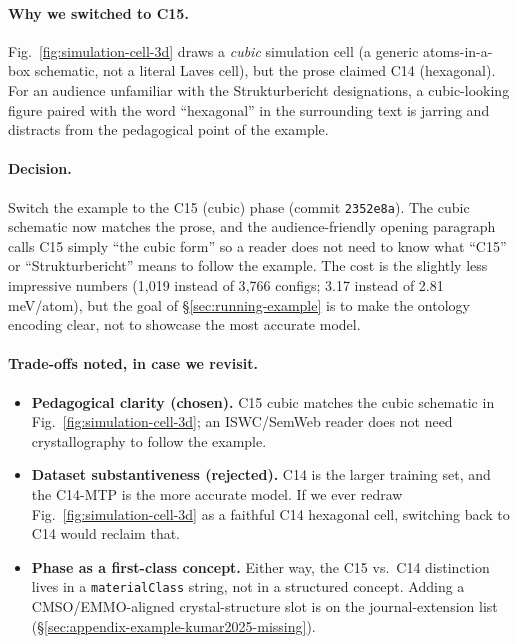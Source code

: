 \paragraph{Why we switched to C15.}
Fig.~\ref{fig:simulation-cell-3d} draws a \emph{cubic} simulation cell
(a generic atoms-in-a-box schematic, not a literal Laves cell), but
the prose claimed C14 (hexagonal). For an audience unfamiliar with
the Strukturbericht designations, a cubic-looking figure paired with
the word ``hexagonal'' in the surrounding text is jarring and
distracts from the pedagogical point of the example.

\paragraph{Decision.}
Switch the example to the C15 (cubic) phase (commit \texttt{2352e8a}).
The cubic schematic now matches the prose, and the audience-friendly
opening paragraph calls C15 simply ``the cubic form'' so a reader does
not need to know what ``C15'' or ``Strukturbericht'' means to follow
the example. The cost is the slightly less impressive numbers
(1{,}019 instead of 3{,}766 configs; 3.17 instead of 2.81 meV/atom),
but the goal of \S\ref{sec:running-example} is to make the ontology
encoding clear, not to showcase the most accurate model.

\paragraph{Trade-offs noted, in case we revisit.}
\begin{itemize}
\item \textbf{Pedagogical clarity (chosen).} C15 cubic matches the
  cubic schematic in Fig.~\ref{fig:simulation-cell-3d}; an
  ISWC/SemWeb reader does not need crystallography to follow the
  example.
\item \textbf{Dataset substantiveness (rejected).} C14 is the larger
  training set, and the C14-MTP is the more accurate model. If we
  ever redraw Fig.~\ref{fig:simulation-cell-3d} as a faithful C14
  hexagonal cell, switching back to C14 would reclaim that.
\item \textbf{Phase as a first-class concept.} Either way, the C15
  vs.\ C14 distinction lives in a \texttt{materialClass} string,
  not in a structured  concept. Adding a
  CMSO/EMMO-aligned crystal-structure slot is on the journal-extension
  list (\S\ref{sec:appendix-example-kumar2025-missing}).
\end{itemize}

